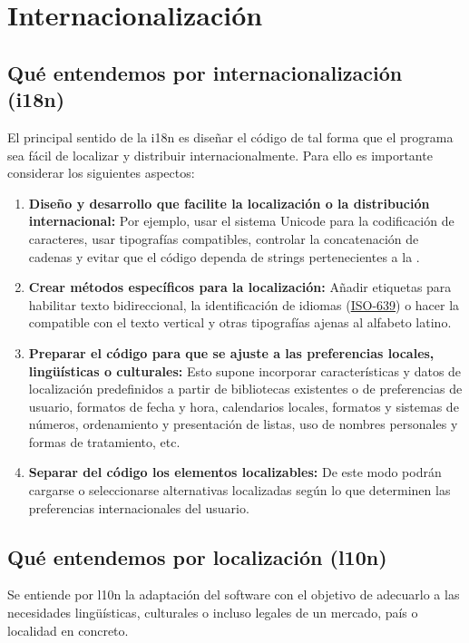 
\section{Internacionalización}\label{i18n:internacionalizacion}

\subsection{Qué entendemos por internacionalización (i18n)}\label{i18n:que-entendemos-i18n}

El principal sentido de la i18n es diseñar el código de tal forma que el programa sea fácil de localizar y distribuir internacionalmente. Para ello es importante considerar los siguientes aspectos:

\begin{enumerate}
	\item \textbf{Diseño y desarrollo que facilite la localización o la distribución internacional:}
	Por ejemplo, usar el sistema Unicode para la codificación de caracteres, usar tipografías compatibles, controlar la concatenación de cadenas y evitar que el código dependa de strings pertenecientes a la .
	
	\item \textbf{Crear métodos específicos para la localización:}
	Añadir etiquetas para habilitar texto bidireccional, la identificación de idiomas (\href{https://es.wikipedia.org/wiki/ISO_639}{ISO-639}) o hacer la  compatible con el texto vertical y otras tipografías ajenas al alfabeto latino.
	
	\item \textbf{Preparar el código para que se ajuste a las preferencias locales, lingüísticas o culturales:}
	Esto supone incorporar características y datos de localización predefinidos a partir de bibliotecas existentes o de preferencias de usuario, formatos de fecha y hora, calendarios locales, formatos y sistemas de números, ordenamiento y presentación de listas, uso de nombres personales y formas de tratamiento, etc.
	
	\item \textbf{Separar del código los elementos localizables:}
	De este modo podrán cargarse o seleccionarse alternativas localizadas según lo que determinen las preferencias internacionales del usuario.
\end{enumerate}

\subsection{Qué entendemos por localización (l10n)}\label{i18n:que-entendemos-l10n}
Se entiende por l10n la adaptación del software con el objetivo de adecuarlo a las necesidades lingüísticas, culturales o incluso legales de un mercado, país o localidad en concreto.

